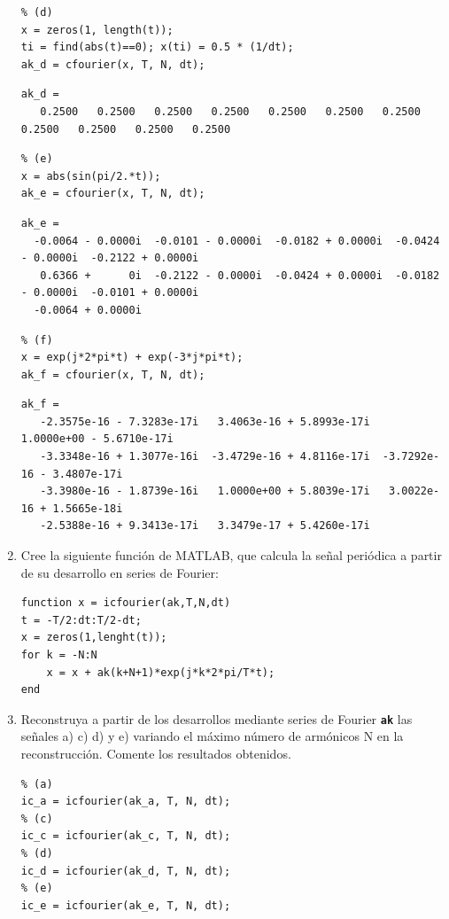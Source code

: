 \documentclass{article}
\newcommand{\code}[1]{\texttt{\textbf{#1}}}
\begin{document}
\begin{enumerate}[leftmargin=*]
\begin{lstlisting}
% (d)
x = zeros(1, length(t));
ti = find(abs(t)==0); x(ti) = 0.5 * (1/dt);
ak_d = cfourier(x, T, N, dt);
\end{lstlisting}

\begin{verbatim}
ak_d =
   0.2500   0.2500   0.2500   0.2500   0.2500   0.2500   0.2500   0.2500   0.2500   0.2500   0.2500
\end{verbatim}

\begin{lstlisting}
% (e)
x = abs(sin(pi/2.*t));
ak_e = cfourier(x, T, N, dt);
\end{lstlisting}

\begin{verbatim}
ak_e =
  -0.0064 - 0.0000i  -0.0101 - 0.0000i  -0.0182 + 0.0000i  -0.0424 - 0.0000i  -0.2122 + 0.0000i   
   0.6366 +      0i  -0.2122 - 0.0000i  -0.0424 + 0.0000i  -0.0182 - 0.0000i  -0.0101 + 0.0000i  
  -0.0064 + 0.0000i
\end{verbatim}

\begin{lstlisting}
% (f)
x = exp(j*2*pi*t) + exp(-3*j*pi*t);
ak_f = cfourier(x, T, N, dt);
\end{lstlisting}

\begin{verbatim}
ak_f =
   -2.3575e-16 - 7.3283e-17i   3.4063e-16 + 5.8993e-17i   1.0000e+00 - 5.6710e-17i  
   -3.3348e-16 + 1.3077e-16i  -3.4729e-16 + 4.8116e-17i  -3.7292e-16 - 3.4807e-17i  
   -3.3980e-16 - 1.8739e-16i   1.0000e+00 + 5.8039e-17i   3.0022e-16 + 1.5665e-18i  
   -2.5388e-16 + 9.3413e-17i   3.3479e-17 + 5.4260e-17i
\end{verbatim}

\item Cree la siguiente función de MATLAB, que calcula la señal periódica a partir de su desarrollo en series de Fourier:

\begin{lstlisting}
function x = icfourier(ak,T,N,dt)
t = -T/2:dt:T/2-dt;
x = zeros(1,lenght(t));
for k = -N:N
    x = x + ak(k+N+1)*exp(j*k*2*pi/T*t);
end
\end{lstlisting}
\item Reconstruya a partir de los desarrollos mediante series de Fourier \code{ak} las señales a) c) d) y e) variando el máximo número de armónicos N en la reconstrucción. Comente los resultados obtenidos.

\begin{lstlisting}
% (a)
ic_a = icfourier(ak_a, T, N, dt);
% (c)
ic_c = icfourier(ak_c, T, N, dt);
% (d)
ic_d = icfourier(ak_d, T, N, dt);
% (e)
ic_e = icfourier(ak_e, T, N, dt);
\end{lstlisting}


\end{enumerate}
\end{document}
